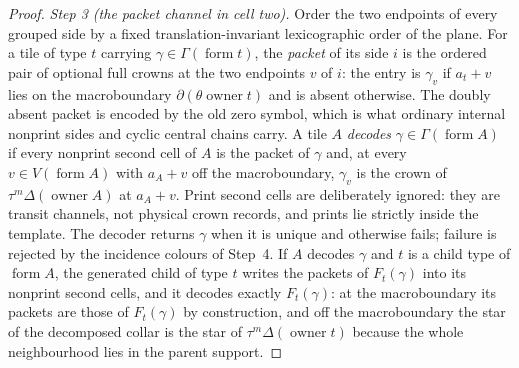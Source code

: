 \begin{proof}
\emph{Step 3 (the packet channel in cell two).}  Order the two endpoints of
every grouped side by a fixed translation-invariant lexicographic order of
the plane.  For a tile of type $t$ carrying $\gamma\in\Gamma(\operatorname
{form}t)$, the \emph{packet} of its side $i$ is the ordered pair of optional
full crowns at the two endpoints $v$ of $i$: the entry is $\gamma_v$ if
$a_t+v$ lies on the macroboundary $\partial(\theta\operatorname{owner}t)$
and is absent otherwise.  The doubly absent packet is encoded by the old
zero symbol, which is what ordinary internal nonprint sides and cyclic
central chains carry.  A tile $A$ \emph{decodes} $\gamma\in\Gamma(\operatorname
{form}A)$ if every nonprint second cell of $A$ is the packet of $\gamma$
and, at every $v\in V(\operatorname{form}A)$ with $a_A+v$ off the
macroboundary, $\gamma_v$ is the crown of $\tau^m\Delta(\operatorname
{owner}A)$ at $a_A+v$.  Print second cells are deliberately ignored: they
are transit channels, not physical crown records, and prints lie strictly
inside the template.  The decoder returns $\gamma$ when it is unique and
otherwise fails; failure is rejected by the incidence colours of Step~4.
If $A$ decodes $\gamma$ and $t$ is a child type of $\operatorname{form}A$,
the generated child of type $t$ writes the packets of $F_t(\gamma)$ into its
nonprint second cells, and it decodes exactly $F_t(\gamma)$: at the
macroboundary its packets are those of $F_t(\gamma)$ by construction, and
off the macroboundary the star of the decomposed collar is the star of
$\tau^m\Delta(\operatorname{owner}t)$ because the whole neighbourhood lies
in the parent support.


\end{proof}

